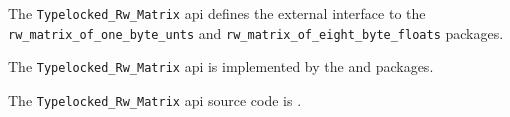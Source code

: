 
The {\tt Typelocked\_Rw\_Matrix} api defines the external interface to the {\tt rw\_matrix\_of\_one\_byte\_unts} and {\tt rw\_matrix\_of\_eight\_byte\_floats} packages.

The {\tt Typelocked\_Rw\_Matrix} api is implemented by the  and  packages.

The {\tt Typelocked\_Rw\_Matrix} api source code is .
